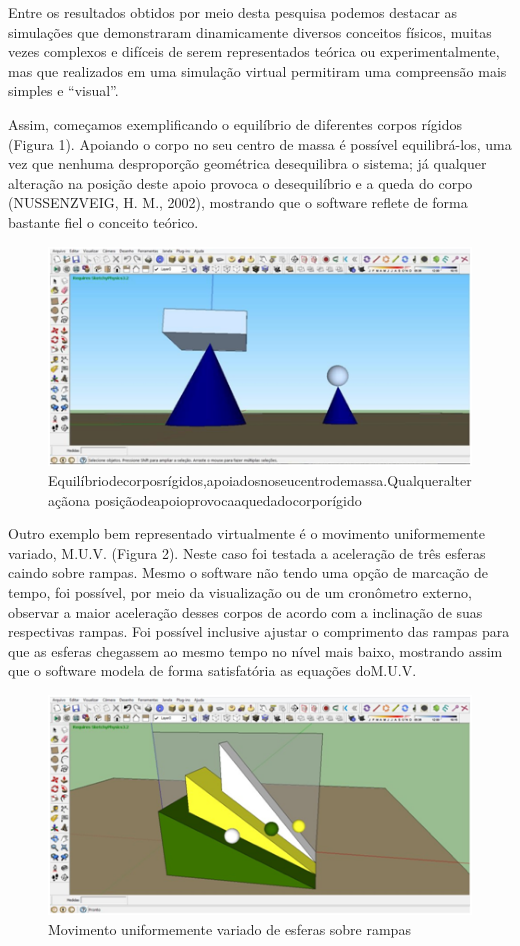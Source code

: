 \documentclass[article,12pt,onesidea,4paper,english,brazil]{abntex2}
\begin{document}
Entre os resultados obtidos por meio desta pesquisa podemos destacar as simulações que demonstraram dinamicamente diversos conceitos físicos, muitas vezes complexos e difíceis de serem representados teórica ou experimentalmente, mas que realizados em uma simulação virtual permitiram uma compreensão mais simples e “visual”. 

Assim, começamos exemplificando o equilíbrio de diferentes corpos rígidos (Figura 1). Apoiando o corpo no seu centro de massa é possível equilibrá-los, uma vez que nenhuma desproporção geométrica desequilibra o sistema; já qualquer alteração na posição deste apoio provoca o desequilíbrio e a queda do corpo (NUSSENZVEIG, H. M., 2002), mostrando que o software reflete de forma bastante fiel o conceito teórico.
\begin{figure}[h]
	\centering
	\includegraphics[width=0.7\linewidth]{pip-pg70-01}
	\caption{Equilíbriodecorposrígidos,apoiadosnoseucentrodemassa.Qualqueralteraçãona posiçãodeapoioprovocaaquedadocorporígido}
	\label{fig:pip-pg70-01}
\end{figure}

Outro exemplo bem representado virtualmente é o movimento uniformemente variado, M.U.V. (Figura 2). Neste caso foi testada a aceleração de três esferas caindo sobre rampas. Mesmo o software não tendo uma opção de marcação de tempo, foi possível, por meio da visualização ou de um cronômetro externo, observar a maior aceleração desses corpos de acordo com a inclinação de suas respectivas rampas. Foi possível inclusive ajustar o comprimento das rampas para que as esferas chegassem ao mesmo tempo no nível mais baixo, mostrando assim que o software modela de forma satisfatória as equações doM.U.V.
\begin{figure}[h]
	\centering
	\includegraphics[width=0.5\linewidth]{pip-pg70-02}
	\caption{Movimento uniformemente variado de esferas sobre rampas}
	\label{fig:pip-pg70-02}
\end{figure}
\end{document}
